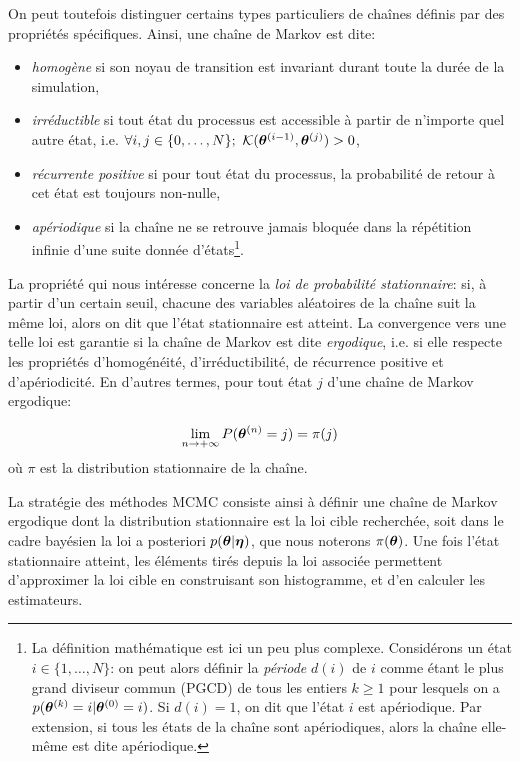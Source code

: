 On peut toutefois distinguer certains types particuliers de chaînes définis par des propriétés spécifiques. Ainsi, une chaîne de Markov est dite:
\begin{itemize}
	\item \textit{homogène} si son noyau de transition est invariant durant toute la durée de la simulation,
	\item \textit{irréductible} si tout état du processus est accessible à partir de n'importe quel autre état, i.e. $\forall i,j \in \{0,\dots,N\}; ~ {\mathcal{K}}({{\bm{\theta}}^{(i-1)}}, {\bm{\theta}}^{(j)}) > 0$,
	\item \textit{récurrente positive} si pour tout état du processus, la probabilité de retour à cet état est toujours non-nulle,
	\item \textit{apériodique} si la chaîne ne se retrouve jamais bloquée dans la répétition infinie d'une suite donnée d'états\footnote{La définition mathématique est ici un peu plus complexe. Considérons un état $i \in \{1, \dots, N\}$: on peut alors définir la \textit{période} $d(i)$ de $i$ comme étant le plus grand diviseur commun (PGCD) de tous les entiers $k \geq 1$ pour lesquels on a $p({\bm{\theta}}^{(k)} = i | {\bm{\theta}}^{(0)} = i)$. Si $d(i) = 1$, on dit que l'état $i$ est apériodique. Par extension, si tous les états de la chaîne sont apériodiques, alors la chaîne elle-même est dite apériodique.}.\\
\end{itemize}

La propriété qui nous intéresse concerne la \textit{loi de probabilité stationnaire}: si, à partir d'un certain seuil, chacune des variables aléatoires de la chaîne suit la même loi, alors on dit que l'état stationnaire est atteint. La convergence vers une telle loi est garantie si la chaîne de Markov est dite \textit{ergodique}, i.e. si elle respecte les propriétés d'homogénéité, d'irréductibilité, de récurrence positive et d'apériodicité. En d'autres termes, pour tout état $j$ d'une chaîne de Markov ergodique:

\begin{equation}
\lim_{n \rightarrow + \infty} P({\bm{\theta}}^{(n)} = j) = \pi(j)
\label{eq_definition_loi_stationnaire}
\end{equation}
où $\pi$ est la distribution stationnaire de la chaîne. 


La stratégie des méthodes MCMC consiste ainsi à définir une chaîne de Markov ergodique dont la distribution stationnaire est la loi cible recherchée, soit dans le cadre bayésien la loi a posteriori ${p({\bm{\theta}} | {\bm{\eta}})}$, que nous noterons $\pi({\bm{\theta}})$. Une fois l'état stationnaire atteint, les éléments tirés depuis la loi associée permettent d'approximer la loi cible en construisant son histogramme, et d'en calculer les estimateurs.\\


